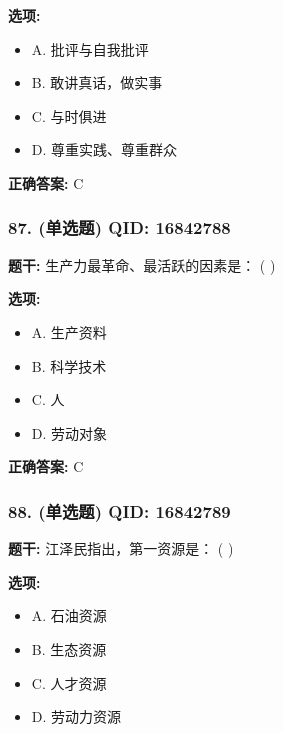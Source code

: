 \documentclass[12pt,UTF8]{ctexart}
\begin{document}
\textbf{选项:}
\begin{itemize}[leftmargin=*]

  \item A. 批评与自我批评

  \item B. 敢讲真话，做实事

  \item C. 与时俱进

  \item D. 尊重实践、尊重群众

\end{itemize}

\textbf{正确答案:}
C

\vspace{0.3em}\hrulefill\vspace{0.7em}

\subsubsection*{87. (单选题) \small QID: 16842788}

\textbf{题干:}
生产力最革命、最活跃的因素是： ( )

\textbf{选项:}
\begin{itemize}[leftmargin=*]

  \item A. 生产资料

  \item B. 科学技术

  \item C. 人

  \item D. 劳动对象

\end{itemize}

\textbf{正确答案:}
C

\vspace{0.3em}\hrulefill\vspace{0.7em}

\subsubsection*{88. (单选题) \small QID: 16842789}

\textbf{题干:}
江泽民指出，第一资源是： ( )

\textbf{选项:}
\begin{itemize}[leftmargin=*]

  \item A. 石油资源

  \item B. 生态资源

  \item C. 人才资源

  \item D. 劳动力资源

\end{itemize}
\end{document}

